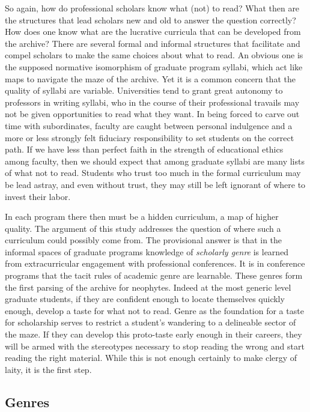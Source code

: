 \documentclass[]{book}
\theoremstyle{definition}
\theoremstyle{definition}
\theoremstyle{definition}
\theoremstyle{remark}
\begin{document}
So again, how do professional scholars know what (not) to read? What
then are the structures that lead scholars new and old to answer the
question correctly? How does one know what are the lucrative curricula
that can be developed from the archive? There are several formal and
informal structures that facilitate and compel scholars to make the same
choices about what to read. An obvious one is the supposed normative
isomorphism of graduate program syllabi, which act like maps to navigate
the maze of the archive. Yet it is a common concern that the quality of
syllabi are variable. Universities tend to grant great autonomy to
professors in writing syllabi, who in the course of their professional
travails may not be given opportunities to read what they want. In being
forced to carve out time with subordinates, faculty are caught between
personal indulgence and a more or less strongly felt fiduciary
responsibility to set students on the correct path. If we have less than
perfect faith in the strength of educational ethics among faculty, then
we should expect that among graduate syllabi are many lists of what not
to read. Students who trust too much in the formal curriculum may be
lead astray, and even without trust, they may still be left ignorant of
where to invest their labor.

In each program there then must be a hidden curriculum, a map of higher
quality. The argument of this study addresses the question of where such
a curriculum could possibly come from. The provisional answer is that in
the informal spaces of graduate programs knowledge of \emph{scholarly
genre} is learned from extracurricular engagement with professional
conferences. It is in conference programs that the tacit rules of
academic genre are learnable. These genres form the first parsing of the
archive for neophytes. Indeed at the most generic level graduate
students, if they are confident enough to locate themselves quickly
enough, develop a taste for what not to read. Genre as the foundation
for a taste for scholarship serves to restrict a student's wandering to
a delineable sector of the maze. If they can develop this proto-taste
early enough in their careers, they will be armed with the stereotypes
necessary to stop reading the wrong and start reading the right
material. While this is not enough certainly to make clergy of laity, it
is the first step.

\hypertarget{genres}{%
\subsection{Genres}\label{genres}}
\end{document}
